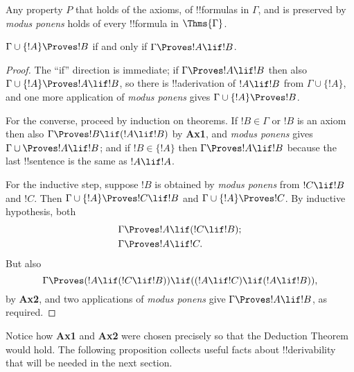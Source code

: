 \documentclass[../../include/open-logic-section]{subfiles}
\begin{document}


\begin{cor}
Any property $P$ that holds of the axioms, of !!{formula}s in
$\Gamma$, and is preserved by \emph{modus ponens} holds of every
!!{formula} in $\Thms{\Gamma}$.
\end{cor}

\begin{thm}
$\Gamma \cup \{!A\} \Proves !B$ if and only if $\Gamma \Proves !A \lif
!B$.
\end{thm}

\begin{proof}
The ``if'' direction is immediate; if $\Gamma \Proves !A \lif !B$ then
also $\Gamma \cup \{!A\}\Proves !A \lif !B$, so there is
!!a{derivation} of $!A\lif !B$ from $\Gamma \cup \{!A\}$, and one more
application of \emph{modus ponens} gives $\Gamma \cup \{!A\} \Proves
!B$.

For the converse, proceed by induction on theorems. If $!B \in \Gamma$
or $!B$ is an axiom then also $\Gamma \Proves !B \lif (!A \lif !B)$ by
\textbf{Ax1}, and \emph{modus ponens} gives $\Gamma\cup \Proves !A
\lif !B$; and if $!B \in \{ !A\}$ then $\Gamma \Proves !A \lif !B$
because the last !!{sentence} is the same as $!A \lif !A$.

For the inductive step, suppose $!B$ is obtained by \emph{modus
  ponens} from $!C \lif !B$ and $!C$. Then $\Gamma \cup \{ !A\}
\Proves !C \lif !B$ and $\Gamma \cup \{ !A\} \Proves !C$. By inductive
hypothesis, both
\begin{align*}
  & \Gamma \Proves !A \lif (!C \lif !B); \\
  & \Gamma \Proves !A \lif !C.
\end{align*}
But also
\[
\Gamma \Proves (!A \lif (!C \lif !B)) \lif
((!A\lif !C)  \lif (!A \lif !B)),
\]
by \textbf{Ax2}, and two applications of \emph{modus ponens} give
$\Gamma \Proves !A \lif !B$, as required.
\end{proof}

Notice how \textbf{Ax1} and \textbf{Ax2} were chosen precisely so that
the Deduction Theorem would hold. The following proposition collects
useful facts about !!{derivability} that will be needed in the next
section.
\end{document}
